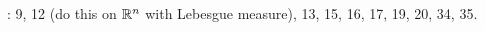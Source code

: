 \endhead
\medskip

: 9,  12 (do this on $\Bbb R^n$ with Lebesgue measure), 13, 15, 16, 17, 19, 20, 34, 35.


%
 
 \enddocument



                                               













